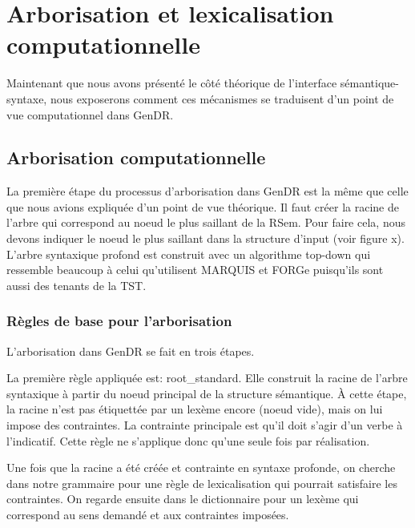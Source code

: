 
\section{Arborisation et lexicalisation computationnelle}\label{secarbolex}

Maintenant que nous avons présenté le côté théorique de l'interface sémantique-syntaxe, nous exposerons comment ces mécanismes se traduisent d'un point de vue computationnel dans GenDR.

\subsection{Arborisation computationnelle}
La première étape du processus d'arborisation dans GenDR est la même que celle que nous avions expliquée d'un point de vue théorique. Il faut créer la racine de l'arbre qui correspond au noeud le plus saillant de la RSem. Pour faire cela, nous devons indiquer le noeud le plus saillant dans la structure d'input (voir figure x). L'arbre syntaxique profond est construit avec un algorithme top-down qui ressemble beaucoup à celui qu'utilisent MARQUIS et FORGe puisqu'ils sont aussi des tenants de la TST. 

\subsubsection{Règles de base pour l'arborisation}
L'arborisation dans GenDR se fait en trois étapes.

La première règle appliquée est: root\_standard. Elle construit la racine de l'arbre syntaxique à partir du noeud principal de la structure sémantique. À cette étape, la racine n'est pas étiquettée par un lexème encore (noeud vide), mais on lui impose des contraintes. La contrainte principale est qu'il doit s'agir d'un verbe à l'indicatif. Cette règle ne s'applique donc qu'une seule fois par réalisation.

Une fois que la racine a été créée et contrainte en syntaxe profonde, on cherche dans notre grammaire pour une règle de lexicalisation qui pourrait satisfaire les contraintes. On regarde ensuite dans le dictionnaire pour un lexème qui correspond au sens demandé et aux contraintes imposées.

